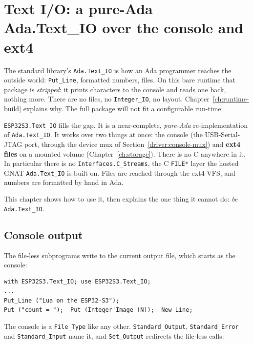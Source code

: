 \chapter{Text I/O: a pure-Ada Ada.Text\_IO over the console and ext4}
\label{ch:text_io}

The standard library's \texttt{Ada.Text\_IO} is how an Ada programmer reaches the
outside world: \texttt{Put\_Line}, formatted numbers, files. On this bare runtime
that package is \emph{stripped}: it prints characters to the console and reads one
back, nothing more. There are no files, no \texttt{Integer\_IO}, no layout.
Chapter~\ref{ch:runtime-build} explains why. The full package will not fit a
configurable run-time.

\texttt{ESP32S3.Text\_IO} fills the gap. It is a near-complete, \emph{pure-Ada}
re-implementation of \texttt{Ada.Text\_IO}. It works over two things at once: the
console (the USB-Serial-JTAG port, through the device mux of
Section~\ref{driver:console-mux}) and \textbf{ext4 files} on a mounted volume
(Chapter~\ref{ch:storage}). There is no C anywhere in it. In particular there is
no \texttt{Interfaces.C\_Streams}, the C \texttt{FILE*} layer the hosted GNAT
\texttt{Ada.Text\_IO} is built on. Files are reached through the ext4 VFS, and
numbers are formatted by hand in Ada.

This chapter shows how to use it, then explains the one thing it cannot do:
\emph{be} \texttt{Ada.Text\_IO}.

\section{Console output}

The file-less subprograms write to the current output file, which starts as the
console:

\begin{lstlisting}
with ESP32S3.Text_IO; use ESP32S3.Text_IO;
...
Put_Line ("Lua on the ESP32-S3");
Put ("count = ");  Put (Integer'Image (N));  New_Line;
\end{lstlisting}


The console is a \texttt{File\_Type} like any other. \texttt{Standard\_Output},
\texttt{Standard\_Error} and \texttt{Standard\_Input} name it, and
\texttt{Set\_Output} redirects the file-less calls:

